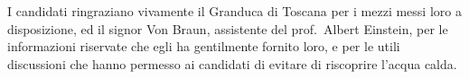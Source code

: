 
\italiano
\ringraziamenti

I candidati ringraziano vivamente il Granduca di Toscana per i mezzi
messi loro a disposizione, ed il signor Von Braun, assistente del
prof.~Albert Einstein, per le informazioni riservate che egli ha
gentilmente fornito loro, e per le utili discussioni che hanno permesso
ai candidati di evitare di riscoprire l'acqua calda.